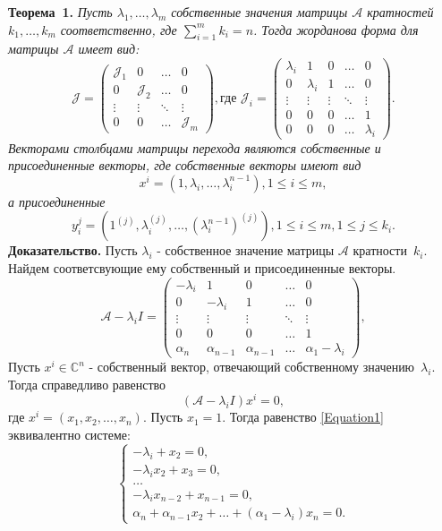 \textbf{Теорема~1.}
{ \it Пусть $\lambda_1, \ldots , \lambda_m$ собственные значения матрицы $\mathcal{A}$ кратностей $k_1, \ldots , k_m$ соответственно, где $\sum\limits_{i=1}^m k_i = n$. Тогда жорданова форма для матрицы $\mathcal{A}$ имеет вид:
$$
	\mathcal{J} = \begin{pmatrix}
		\mathcal{J}_1 & 0 & \dots & 0 \\
		0 & \mathcal{J}_2 & \dots & 0 \\
		\vdots & \vdots & \ddots & \vdots \\
		0 & 0 & \dots & \mathcal{J}_m
	\end{pmatrix}, {\text{где }}
	\mathcal{J}_i = \begin{pmatrix}
		\lambda_i & 1 & 0 & \dots & 0 \\
		0 & \lambda_i & 1 & \dots & 0 \\
		\vdots & \vdots & \vdots & \ddots & \vdots \\
		0 & 0 & 0 & \dots & 1 \\
		0 & 0 & 0 & \dots & \lambda_i
	\end{pmatrix}.
$$
Векторами столбцами матрицы перехода являются собственные и присоединенные векторы, где собственные векторы имеют вид
$$x^i =(1, \lambda_i, \ldots, \lambda_i^{n-1}), 1 \leqslant i \leqslant m,$$
а присоединенные
$$y_i^j = (1^{(j)}, \lambda_i^{(j)}, \ldots , (\lambda_i^{n-1})^{(j)}), 1 \leqslant i \leqslant m, 1 \leqslant j \leqslant k_i.$$} 
\textbf{Доказательство.} Пусть $\lambda_i$ - собственное значение матрицы $\mathcal{A}$ кратности~$k_i$. Найдем соответсвующие ему собственный и присоединенные векторы.
$$
\mathcal{A}-\lambda_i I = 
\begin{pmatrix}
	-\lambda_i & 1 & 0 & \dots & 0 \\
	0 & -\lambda_i & 1 & \dots & 0 \\
	\vdots & \vdots & \vdots & \ddots & \vdots \\
	0 & 0 & 0 & \dots & 1 \\
	\alpha_n & \alpha_{n-1} & \alpha_{n-1} & \dots & \alpha_1-\lambda_i
\end{pmatrix},
$$ 
Пусть $x^i \in \mathbb{C}^n$ - собственный вектор, отвечающий собственному значению~$\lambda_i$. Тогда справедливо равенство
\begin{equation}\label{Equation1}
\left(\mathcal{A}-\lambda_i I \right) x^i = 0,
\end{equation}
где $x^i = \left( x_1, x_2, \dots, x_n \right)$. Пусть $x_1 = 1$. Тогда равенство \eqref{Equation1} эквивалентно системе:
\begin{equation}\label{SystemForVector}
\begin{cases}
-\lambda_i + x_2 = 0, \\
-\lambda_i x_2 + x_3 = 0, \\
\dots \\
-\lambda_i x_{n-2} + x_{n-1} = 0, \\
\alpha_n + \alpha_{n-1} x_2 + \dots + (\alpha_1 - \lambda_i) x_n = 0.
\end{cases}
\end{equation}
